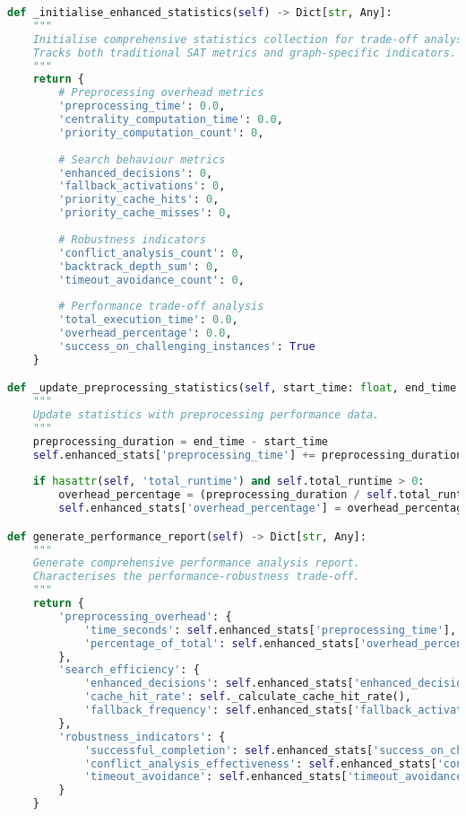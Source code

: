\begin{lstlisting}[language=Python, caption=Comprehensive Performance Monitoring Infrastructure]
def _initialise_enhanced_statistics(self) -> Dict[str, Any]:
    """
    Initialise comprehensive statistics collection for trade-off analysis.
    Tracks both traditional SAT metrics and graph-specific indicators.
    """
    return {
        # Preprocessing overhead metrics
        'preprocessing_time': 0.0,
        'centrality_computation_time': 0.0,
        'priority_computation_count': 0,
        
        # Search behaviour metrics
        'enhanced_decisions': 0,
        'fallback_activations': 0,
        'priority_cache_hits': 0,
        'priority_cache_misses': 0,
        
        # Robustness indicators
        'conflict_analysis_count': 0,
        'backtrack_depth_sum': 0,
        'timeout_avoidance_count': 0,
        
        # Performance trade-off analysis
        'total_execution_time': 0.0,
        'overhead_percentage': 0.0,
        'success_on_challenging_instances': True
    }

def _update_preprocessing_statistics(self, start_time: float, end_time: float) -> None:
    """
    Update statistics with preprocessing performance data.
    """
    preprocessing_duration = end_time - start_time
    self.enhanced_stats['preprocessing_time'] += preprocessing_duration
    
    if hasattr(self, 'total_runtime') and self.total_runtime > 0:
        overhead_percentage = (preprocessing_duration / self.total_runtime) * 100
        self.enhanced_stats['overhead_percentage'] = overhead_percentage

def generate_performance_report(self) -> Dict[str, Any]:
    """
    Generate comprehensive performance analysis report.
    Characterises the performance-robustness trade-off.
    """
    return {
        'preprocessing_overhead': {
            'time_seconds': self.enhanced_stats['preprocessing_time'],
            'percentage_of_total': self.enhanced_stats['overhead_percentage']
        },
        'search_efficiency': {
            'enhanced_decisions': self.enhanced_stats['enhanced_decisions'],
            'cache_hit_rate': self._calculate_cache_hit_rate(),
            'fallback_frequency': self.enhanced_stats['fallback_activations']
        },
        'robustness_indicators': {
            'successful_completion': self.enhanced_stats['success_on_challenging_instances'],
            'conflict_analysis_effectiveness': self.enhanced_stats['conflict_analysis_count'],
            'timeout_avoidance': self.enhanced_stats['timeout_avoidance_count']
        }
    }
\end{lstlisting}


